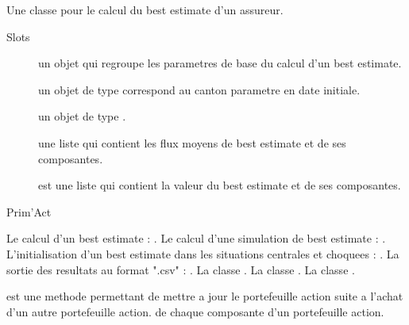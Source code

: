 \documentclass[a4paper]{book}
\begin{document}
%
\begin{Description}\relax
Une classe pour le calcul du best estimate d'un assureur.
\end{Description}
%
\begin{Section}{Slots}

\begin{description}

\item[] un objet  qui regroupe les parametres de base du calcul d'un best estimate.

\item[] un objet de type  correspond au canton parametre en date initiale.

\item[] un objet de type .

\item[] une liste qui contient les flux moyens de best estimate et de ses composantes.

\item[] est une liste qui contient la valeur du best estimate et de ses composantes.

\end{description}
\end{Section}
%
\begin{Author}\relax
Prim'Act
\end{Author}
%
\begin{SeeAlso}\relax
Le calcul d'un best estimate : .
Le calcul d'une simulation de best estimate : .
L'initialisation d'un best estimate dans les situations centrales et choquees : .
La sortie des resultats au format ".csv" : .
La classe .
La classe .
La classe .
\end{SeeAlso}
%
\begin{Description}\relax
{} est une methode permettant de mettre a jour le portefeuille action suite a l'achat d'un autre portefeuille action.
de chaque composante d'un portefeuille action.
\end{Description}
\end{document}
